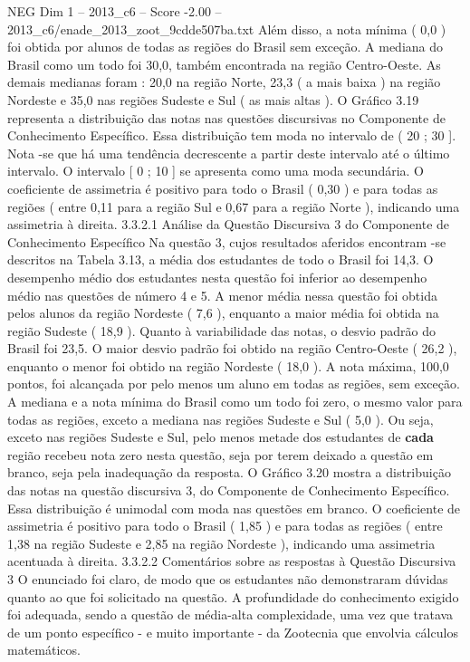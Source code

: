 \begin{textsample}{NEG Dim 1 – 2013\_c6 – Score -2.00 – 2013\_c6/enade\_2013\_zoot\_9cdde507ba.txt}
Além disso, a nota mínima ( 0,0 ) foi obtida por alunos de todas as regiões do Brasil sem exceção.
A mediana do Brasil como um todo foi 30,0, também encontrada na região Centro-Oeste.
As demais medianas foram : 20,0 na região Norte, 23,3 ( a mais baixa ) na região Nordeste e 35,0 nas regiões Sudeste e Sul ( as mais altas ).
O Gráfico 3.19 representa a distribuição das notas nas questões discursivas no Componente de Conhecimento Específico.
Essa distribuição tem moda no intervalo de ( 20 ; 30 ].
Nota -se que há uma tendência decrescente a partir deste intervalo até o último intervalo.
O intervalo [ 0 ; 10 ] se apresenta como uma moda secundária.
O coeficiente de assimetria é positivo para todo o Brasil ( 0,30 ) e para todas as regiões ( entre 0,11 para a região Sul e 0,67 para a região Norte ), indicando uma assimetria à direita. 3.3.2.1 Análise da Questão Discursiva 3 do Componente de Conhecimento Específico Na questão 3, cujos resultados aferidos encontram -se descritos na Tabela 3.13, a média dos estudantes de todo o Brasil foi 14,3.
O desempenho médio dos estudantes nesta questão foi inferior ao desempenho médio nas questões de número 4 e 5.
A menor média nessa questão foi obtida pelos alunos da região Nordeste ( 7,6 ), enquanto a maior média foi obtida na região Sudeste ( 18,9 ).
Quanto à variabilidade das notas, o desvio padrão do Brasil foi 23,5.
O maior desvio padrão foi obtido na região Centro-Oeste ( 26,2 ), enquanto o menor foi obtido na região Nordeste ( 18,0 ).
A nota máxima, 100,0 pontos, foi alcançada por pelo menos um aluno em todas as regiões, sem exceção.
A mediana e a nota mínima do Brasil como um todo foi zero, o mesmo valor para todas as regiões, exceto a mediana nas regiões Sudeste e Sul ( 5,0 ).
Ou seja, exceto nas regiões Sudeste e Sul, pelo menos metade dos estudantes de \textbf{cada} região recebeu nota zero nesta questão, seja por terem deixado a questão em branco, seja pela inadequação da resposta.
O Gráfico 3.20 mostra a distribuição das notas na questão discursiva 3, do Componente de Conhecimento Específico.
Essa distribuição é unimodal com moda nas questões em branco.
O coeficiente de assimetria é positivo para todo o Brasil ( 1,85 ) e para todas as regiões ( entre 1,38 na região Sudeste e 2,85 na região Nordeste ), indicando uma assimetria acentuada à direita. 3.3.2.2 Comentários sobre as respostas à Questão Discursiva 3 O enunciado foi claro, de modo que os estudantes não demonstraram dúvidas quanto ao que foi solicitado na questão.
A profundidade do conhecimento exigido foi adequada, sendo a questão de média-alta complexidade, uma vez que tratava de um ponto específico - e muito importante - da Zootecnia que envolvia cálculos matemáticos.

\end{textsample}
